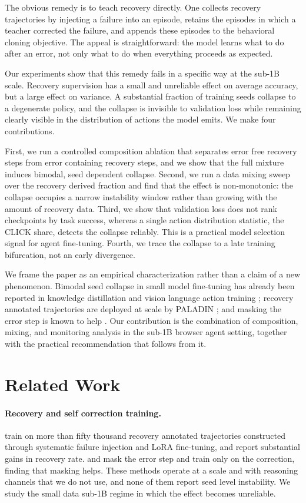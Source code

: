 \documentclass[11pt]{article}
\begin{document}
The obvious remedy is to teach recovery directly. One collects recovery
trajectories by injecting a failure into an episode, retains the episodes in
which a teacher corrected the failure, and appends these episodes to the
behavioral cloning objective. The appeal is straightforward: the model learns
what to do after an error, not only what to do when everything proceeds as
expected.

Our experiments show that this remedy fails in a specific way at the sub-1B
scale. Recovery supervision has a small and unreliable effect on average
accuracy, but a large effect on variance. A substantial fraction of training
seeds collapse to a degenerate policy, and the collapse is invisible to
validation loss while remaining clearly visible in the distribution of actions
the model emits. We make four contributions.

First, we run a controlled composition ablation that separates error free
recovery steps from error containing recovery steps, and we show that the full
mixture induces bimodal, seed dependent collapse. Second, we run a data mixing
sweep over the recovery derived fraction and find that the effect is
non-monotonic: the collapse occupies a narrow instability window rather than
growing with the amount of recovery data. Third, we show that validation loss
does not rank checkpoints by task success, whereas a single action distribution
statistic, the CLICK share, detects the collapse reliably. This is a practical
model selection signal for agent fine-tuning. Fourth, we trace the collapse to
a late training bifurcation, not an early divergence.

We frame the paper as an empirical characterization rather than a claim of a
new phenomenon. Bimodal seed collapse in small model fine-tuning has already
been reported in knowledge distillation \citep{noisefloor2026} and vision
language action training \citep{vla2026}; recovery annotated trajectories are
deployed at scale by PALADIN \citep{paladin2025}; and masking the error step is
known to help \citep{step2025,srft2026}. Our contribution is the combination of
composition, mixing, and monitoring analysis in the sub-1B browser agent
setting, together with the practical recommendation that follows from it.

\section{Related Work}

\paragraph{Recovery and self correction training.}
\citet{paladin2025} train on more than fifty thousand recovery annotated
trajectories constructed through systematic failure injection and LoRA
fine-tuning, and report substantial gains in recovery rate. \citet{step2025}
and \citet{srft2026} mask the error step and train only on the correction,
finding that masking helps. These methods operate at a scale and with reasoning
channels that we do not use, and none of them report seed level instability. We
study the small data sub-1B regime in which the effect becomes unreliable.
\end{document}
